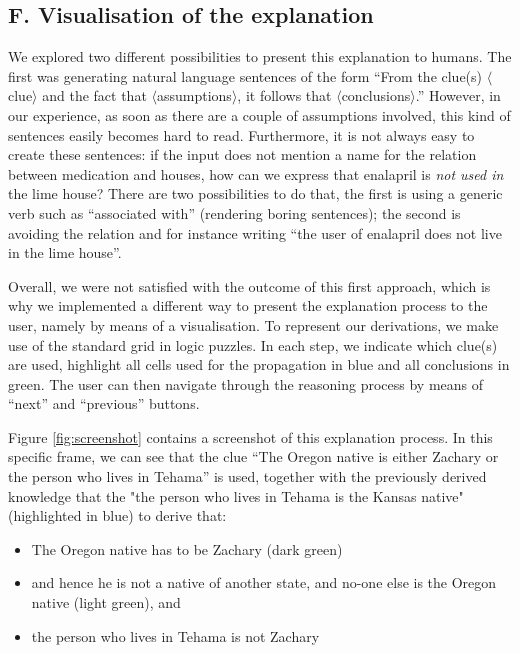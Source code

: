 \subsection{F. Visualisation of the explanation}
We explored two different possibilities to present this explanation to humans. 
The first was generating natural language sentences of the form 
``From the clue(s) $\langle$clue$\rangle$ and the fact that $\langle$assumptions$\rangle$, it follows that $\langle$conclusions$\rangle$.''
However, in our experience, as soon as there are a couple of assumptions involved, this kind of sentences easily becomes hard to read. Furthermore, it is not always easy to create these sentences: if the input does not mention a name for the relation between medication and houses, how can we express that enalapril is \emph{not used in} the lime house? 
There are two possibilities to do that, the first is using a generic verb such as ``associated with'' (rendering boring sentences); the second is avoiding the relation and for instance writing ``the user of enalapril does not live in the lime house''. 

Overall, we were not satisfied with the outcome of this first approach, which is why we implemented a different way to present the explanation process to the user, namely by means of a visualisation. To represent our derivations, we make use of the standard grid in logic puzzles. In each step, we indicate which clue(s) are used, highlight all cells used for the propagation in blue and all conclusions in green. 
The user can then navigate through the reasoning process by means of ``next'' and ``previous'' buttons. 

Figure \ref{fig:screenshot} contains a screenshot of this explanation process. 
In this specific frame, we can see that the clue ``The Oregon native is either Zachary or the person who lives in Tehama'' is used, together with the previously derived knowledge that the "the person who lives in Tehama is the Kansas native" (highlighted in blue) to derive that:
\begin{itemize}
 \item The Oregon native has to be Zachary  (dark green)
 \item and hence he is not a native of another state, and no-one else is the Oregon native (light green), and
 \item the person who lives in Tehama is not Zachary 
\end{itemize}

